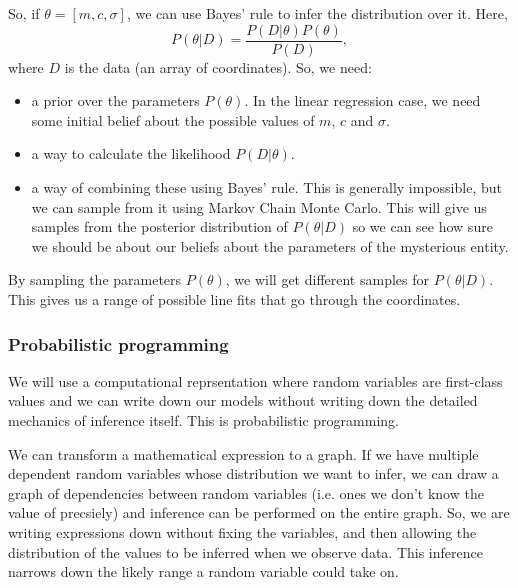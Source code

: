 \documentclass[a4paper, openany]{memoir}
\begin{document}
So, if $\theta = [m, c, \sigma]$, we can use Bayes' rule to infer the distribution over it. Here,
\[P(\theta|D) = \frac{P(D|\theta) P(\theta)}{P(D)},\]
where $D$ is the data (an array of coordinates). So, we need:
\begin{itemize}
    \item a prior over the parameters $P(\theta)$. In the linear regression case, we need some initial belief about the possible values of $m$, $c$ and $\sigma$.
    \item a way to calculate the likelihood $P(D|\theta)$.
    \item a way of combining these using Bayes' rule. This is generally impossible, but we can sample from it using Markov Chain Monte Carlo. This will give us samples from the posterior distribution of $P(\theta|D)$ so we can see how sure we should be about our beliefs about the parameters of the mysterious entity.
\end{itemize}
By sampling the parameters $P(\theta)$, we will get different samples for $P(\theta|D)$. This gives us a range of possible line fits that go through the coordinates.

\subsubsection{Probabilistic programming}
We will use a computational reprsentation where random variables are first-class values and we can write down our models without writing down the detailed mechanics of inference itself. This is probabilistic programming.

We can transform a mathematical expression to a graph. If we have multiple dependent random variables whose distribution we want to infer, we can draw a graph of dependencies between random variables (i.e. ones we don't know the value of precsiely) and inference can be performed on the entire graph. So, we are writing expressions down without fixing the variables, and then allowing the distribution of the values to be inferred when we observe data. This inference narrows down the likely range a random variable could take on.
\end{document}

